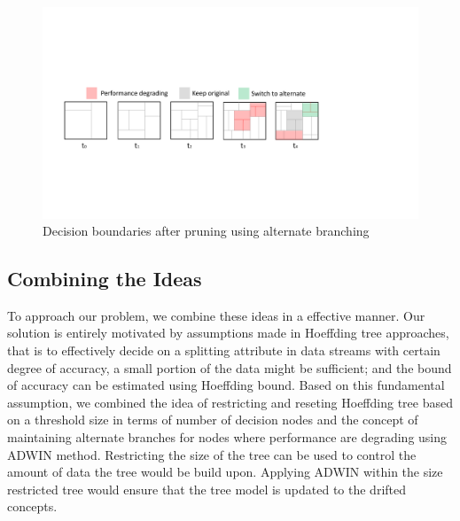 \begin{figure}[htbp]
    \begin{center}
        \includegraphics[width=14.0cm]{figs/prunedb.pdf}
        \caption{Decision boundaries after pruning using alternate branching}
        \label{fig:algo:prunedb}
    \end{center}
\end{figure}

\subsection{Combining the Ideas}
To approach our problem, we combine these ideas in a effective manner. Our solution is entirely motivated by assumptions made in Hoeffding tree approaches, that is to effectively decide on a splitting attribute in data streams with certain degree of accuracy, a small portion of the data might be sufficient; and the bound of accuracy can be estimated using Hoeffding bound. Based on this fundamental assumption, we combined the idea of restricting and reseting Hoeffding tree based on a threshold size in terms of number of decision nodes and the concept of maintaining alternate branches for nodes where performance are degrading using ADWIN method. Restricting the size of the tree can be used to control the amount of data the tree would be build upon. Applying ADWIN within the size restricted tree would ensure that the tree model is updated to the drifted concepts. 

